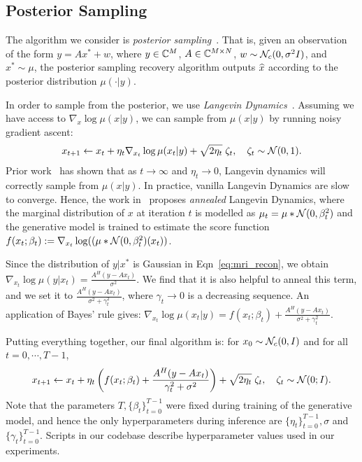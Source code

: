 \subsection{Posterior Sampling}

The algorithm we consider is \emph{posterior
sampling}~\cite{jalal2021instance}.  That is, given an observation of
the form $y = Ax^* + w$, where $y \in \mathbb{C}^M$, $A \in \mathbb{C}^{M \times N}$,
$w \sim \mathcal N_c(0,\sigma^2 I)$, and $x^* \sim \mu$, the posterior
sampling recovery algorithm outputs $\widehat{x}$ according to the posterior
distribution $\mu(\cdot | y)$. 

In order to sample from the posterior, we use \emph{Langevin
Dynamics}~\cite{bakry1985diffusions}. Assuming we have access to
$\nabla_x \log \mu(x|y)$, we can sample from $\mu(x|y)$ by running
noisy gradient ascent:
\begin{align}
  x_{t+1} \leftarrow x_t + \eta_t \nabla_{x_t} \log \mu(x_t |
  y) + \sqrt{2 \eta_t} \; \zeta_t, \quad \zeta_t \sim \mathcal N(0,1).
  \label{eqn:langevin}
\end{align}
Prior work~\cite{bakry1985diffusions} has shown that as $t\to \infty$
and $\eta_t \to 0$, Langevin dynamics will correctly sample from
$\mu(x|y)$.  In practice, vanilla Langevin Dynamics are slow to
converge. Hence, the work in~\cite{song2019generative} proposes
\emph{annealed} Langevin Dynamics, where the marginal distribution of
$x$ at iteration $t$ is modelled as $\mu_t = \mu * \mathcal N(0, \beta_t^2)$
and the generative model is trained to estimate the score function
$f(x_t; \beta_t) := \nabla_{x_t} \log ((\mu * \mathcal N(0,\beta_t^2)(x_t))$.

Since the distribution of $y|x^*$ is Gaussian in
Eqn~\eqref{eq:mri_recon}, we obtain $\nabla_{x_t}\log \mu(y | x_t) =
\frac{A^H (y- A x_t) }{\sigma^2}$.  We find that it is also helpful to
anneal this term, and we set it to $\frac{A^H (y - Ax_t)}{\sigma^2 +
\gamma_t^2}$, where $\gamma_t\to 0$ is a decreasing sequence. An
application of Bayes' rule gives: $\nabla_{x_t} \log \mu(x_t | y) =
f(x_t; \beta_t) + \frac{A^H (y - Ax_t)}{\sigma^2 + \gamma_t^2}$.

Putting everything together, our final algorithm is: for $x_0 \sim
\mathcal N_c(0,I)$ and for all $t=0, \cdots, T-1$, 
\begin{align}
  x_{t+1} \leftarrow x_t + \eta_t \left(f(x_t; \beta_t) + \frac{A^H (y - A
  x_t)}{\gamma^2_t + \sigma^2}\right) + \sqrt{2 \eta_t} \; \zeta_t,
	\quad \zeta_t
  \sim \mathcal N(0; I).
  \label{eqn:annealed-langevin}
\end{align}
Note that the parameters $T, \{ \beta_t\}_{t=0}^{T-1}$ were fixed
during training of the generative model, and hence the only
hyperparameters during inference are $\{\eta_t\}_{t=0}^{T-1}, \sigma$ and
$\{\gamma_t\}_{t=0}^{T-1}$. Scripts in our codebase
describe hyperparameter values used in our experiments.


